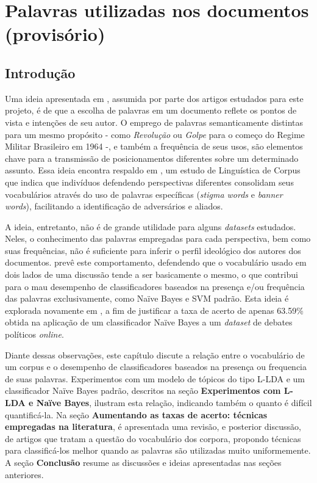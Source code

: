\chapter{Palavras utilizadas nos documentos (provisório)}

\section{Introdução}

Uma ideia apresentada em \cite{lin-et-al2006}, assumida por parte dos artigos estudados para este projeto, é de que a escolha de palavras em um documento reflete os pontos de vista e intenções de seu autor. O emprego de palavras semanticamente distintas para um mesmo propósito - como \emph{Revolução} ou \emph{Golpe} para o começo do Regime Militar Brasileiro em 1964 -, e também a frequência de seus usos, são elementos chave para a transmissão de posicionamentos diferentes sobre um determinado assunto. %
Essa ideia encontra respaldo em \cite{teubert2001}, um estudo de Linguística de Corpus \cite{biber-d1998}\cite{halliday2004} que indica que indivíduos defendendo perspectivas diferentes consolidam seus vocabulários através do uso de palavras específicas (\emph{stigma words} e \emph{banner words}), facilitando a identificação de adversários e aliados. 

A ideia, entretanto, não é de grande utilidade para alguns \emph{datasets} estudados. Neles, o conhecimento das palavras empregadas para cada perspectiva, bem como suas frequências, não é suficiente para inferir o perfil ideológico dos autores dos documentos. \cite{agrawal2003} prevê este comportamento, defendendo que o vocabulário usado em dois lados de uma discussão tende a ser basicamente o mesmo, o que contribui para o mau desempenho de classificadores baseados na presença e/ou frequência das palavras exclusivamente, como Naïve Bayes e SVM padrão. Esta ideia é explorada novamente em \cite{malouf-taking_sides}, a fim de justificar a taxa de acerto de apenas 63.59\% obtida na aplicação de um classificador Naïve Bayes a um \emph{dataset} de debates políticos \emph{online}.

Diante dessas observações, este capítulo discute a relação entre o vocabulário de um corpus e o desempenho de classificadores baseados na presença ou frequencia de suas palavras. Experimentos com um modelo de tópicos do tipo L-LDA e um classificador Naïve Bayes padrão, descritos na seção \textbf{Experimentos com L-LDA e Naïve Bayes}, ilustram esta relação, indicando também o quanto é difícil quantificá-la. Na seção \textbf{Aumentando as taxas de acerto: técnicas empregadas na literatura}, é apresentada uma revisão, e posterior discussão, de artigos que tratam a questão do vocabulário dos corpora, propondo técnicas para classificá-los melhor quando as palavras são utilizadas muito uniformemente. A seção \textbf{Conclusão} resume as discussões e ideias apresentadas nas seções anteriores.


